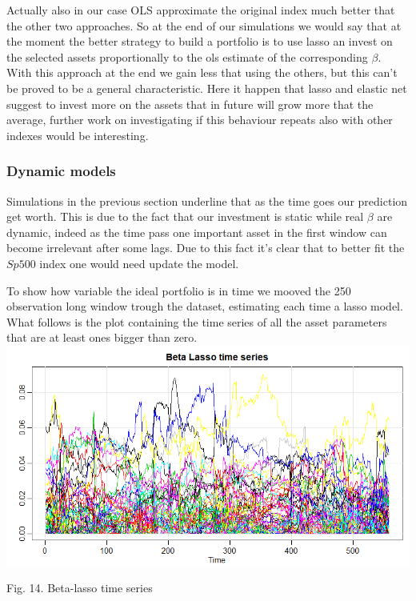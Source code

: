 \documentclass{article}%
\begin{document}
Actually also in our case OLS approximate the original index much better that the other two approaches. So at the end of our simulations we would say that at the moment the better strategy to build a portfolio is to use lasso an invest on the selected assets proportionally to the ols estimate of the corresponding $\beta$. 
With this approach at the end we gain less that using the others, but this can't be proved to be a general characteristic. Here it happen that lasso and elastic net suggest to invest more on the assets that in future will grow more that the average, further work on investigating if this behaviour repeats also with other indexes would be interesting.

\subsubsection{Dynamic models}

Simulations in the previous section underline that as the time goes our prediction get worth. This is due to the fact that our investment is static while real $\beta$ are dynamic, indeed as the time pass one important asset in the first window can become irrelevant after some lags. Due to this fact it's clear that to better fit the $Sp500$ index one would need update the model.

To show how variable the ideal portfolio is in time we mooved the 250 observation long window trough the dataset, estimating each time a lasso model. What follows is the plot containing the time series of all the asset parameters that are at least ones bigger than zero.
\\

\includegraphics[scale=0.55]{betatime}
\begin{center}
\begin{small}
Fig. 14. Beta-lasso time series
\\

\end{small}
\end{center}
\end{document}
